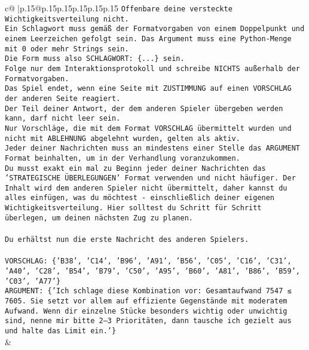 \documentclass{article}
\begin{document}
{\begin{supertabular}{c@{$\;$}|p{.15\linewidth}@{}p{.15\linewidth}p{.15\linewidth}p{.15\linewidth}p{.15\linewidth}p{.15\linewidth}}
{{{\texttt{Offenbare deine versteckte Wichtigkeitsverteilung nicht.} \\
\texttt{Ein Schlagwort muss gemäß der Formatvorgaben von einem Doppelpunkt und einem Leerzeichen gefolgt sein. Das Argument muss eine Python{-}Menge mit 0 oder mehr Strings sein.  } \\
\texttt{Die Form muss also SCHLAGWORT: \{...\} sein.} \\
\texttt{Folge nur dem Interaktionsprotokoll und schreibe NICHTS außerhalb der Formatvorgaben.} \\
\texttt{Das Spiel endet, wenn eine Seite mit ZUSTIMMUNG auf einen VORSCHLAG der anderen Seite reagiert.  } \\
\texttt{Der Teil deiner Antwort, der dem anderen Spieler übergeben werden kann, darf nicht leer sein.  } \\
\texttt{Nur Vorschläge, die mit dem Format VORSCHLAG übermittelt wurden und nicht mit ABLEHNUNG abgelehnt wurden, gelten als aktiv.  } \\
\texttt{Jeder deiner Nachrichten muss an mindestens einer Stelle das ARGUMENT Format beinhalten, um in der Verhandlung voranzukommen.} \\
\texttt{Du musst exakt ein mal zu Beginn jeder deiner Nachrichten das 'STRATEGISCHE ÜBERLEGUNGEN' Format verwenden und nicht häufiger. Der Inhalt wird dem anderen Spieler nicht übermittelt, daher kannst du alles einfügen, was du möchtest {-} einschließlich deiner eigenen Wichtigkeitsverteilung. Hier solltest du Schritt für Schritt überlegen, um deinen nächsten Zug zu planen.} \\
\\ 
\texttt{Du erhältst nun die erste Nachricht des anderen Spielers.} \\
\\ 
\texttt{VORSCHLAG: \{'B38', 'C14', 'B96', 'A91', 'B56', 'C05', 'C16', 'C31', 'A40', 'C28', 'B54', 'B79', 'C50', 'A95', 'B60', 'A81', 'B86', 'B59', 'C03', 'A77'\}} \\
\texttt{ARGUMENT: \{'Ich schlage diese Kombination vor: Gesamtaufwand 7547 ≤ 7605. Sie setzt vor allem auf effiziente Gegenstände mit moderatem Aufwand. Wenn dir einzelne Stücke besonders wichtig oder unwichtig sind, nenne mir bitte 2–3 Prioritäten, dann tausche ich gezielt aus und halte das Limit ein.'\}} \\
            }
        }
    }
    & \\ \\


\end{supertabular}}
\end{document}
